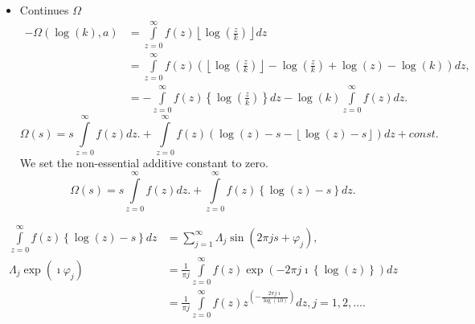 \documentclass[titlepage,fleqn]{article}%
\begin{document}
\begin{itemize}
\item Continues $\Omega$%
\begin{align*}
-\Omega(\log(k),a)  &  =%
{\displaystyle\int\limits_{z=0}^{\infty}}
f(z)\left\lfloor \log\left(  \frac{z}{k}\right)  \right\rfloor dz\\
&  =%
{\displaystyle\int\limits_{z=0}^{\infty}}
f(z)\left(  \left\lfloor \log\left(  \frac{z}{k}\right)  \right\rfloor
-\log\left(  \frac{z}{k}\right)  +\log\left(  z\right)  -\log\left(  k\right)
\right)  dz,\\
&  =-%
{\displaystyle\int\limits_{z=0}^{\infty}}
f(z)\left\{  \log\left(  \frac{z}{k}\right)  \right\}  dz-\log\left(
k\right)
{\displaystyle\int\limits_{z=0}^{\infty}}
f(z)dz.
\end{align*}%
\[
\Omega(s)=s%
{\displaystyle\int\limits_{z=0}^{\infty}}
f(z)dz.+%
{\displaystyle\int\limits_{z=0}^{\infty}}
f(z)\left(  \log\left(  z\right)  -s-\left\lfloor \log\left(  z\right)
-s\right\rfloor \right)  dz+const.
\]
We set the non-essential additive constant to zero.%
\[
\Omega(s)=s%
{\displaystyle\int\limits_{z=0}^{\infty}}
f(z)dz.+%
{\displaystyle\int\limits_{z=0}^{\infty}}
f(z)\left\{  \log\left(  z\right)  -s\right\}  dz.
\]

\end{itemize}

%

\begin{align*}%
{\displaystyle\int\limits_{z=0}^{\infty}}
f(z)\left\{  \log\left(  z\right)  -s\right\}  dz  &  =%
{\displaystyle\sum\limits_{j=1}^{\infty}}
\Lambda_{j}\sin(2\pi js+\varphi_{j}),\\
\Lambda_{j}\exp(\imath\varphi_{j})  &  =\frac{1}{\pi j}%
{\displaystyle\int\limits_{z=0}^{\infty}}
f(z)\exp(-2\pi j\imath\left\{  \log\left(  z\right)  \right\}  )dz\\
&  =\frac{1}{\pi j}%
{\displaystyle\int\limits_{z=0}^{\infty}}
f(z)z^{\left(  -\frac{2\pi j\imath}{\log\left(  10\right)  }\right)
}dz,j=1,2,\ldots.
\end{align*}
\end{document}
